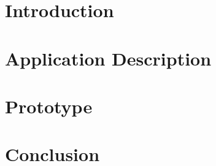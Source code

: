 \documentclass[
10pt, %
a4paper, %
oneside, %
headinclude,footinclude, %
BCOR5mm, %
]{scrartcl}
\begin{document}
\section{Introduction} %
\label{sec:introduction}




\section{Application Description} %
\label{sec:application_description}


\section{Prototype} %
\label{sec:prototype}


\section{Conclusion} %
\label{sec:conclusion}


\newpage



% 



\end{document}
